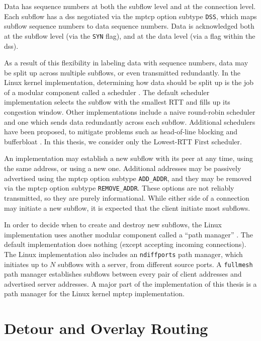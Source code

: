 \documentclass{cwru}
\begin{document}
Data has sequence numbers at both the subflow level and at the connection level.
Each subflow has a \ac{dss} negotiated via the \ac{mptcp} option subtype
\texttt{DSS}, which maps subflow sequence numbers to data sequence numbers. Data
is acknowledged both at the subflow level (via the \texttt{SYN} flag), and at
the data level (via a flag within the \ac{dss}).

As a result of this flexibility in labeling data with sequence numbers, data may
be split up across multiple subflows, or even transmitted redundantly. In the
Linux kernel implementation, determining how data should be split up is the job
of a modular component called a scheduler \cite{mptcp}. The default scheduler
implementation selects the subflow with the smallest RTT and fills up its
congestion window. Other implementations include a naive round-robin scheduler
and one which sends data redundantly across each subflow. Additional schedulers
have been proposed, to mitigate problems such as head-of-line blocking and
bufferbloat \cite{paasch2014experimental}. In this thesis, we consider only the
Lowest-RTT First scheduler.

An implementation may establish a new subflow with its peer at any time, using
the same address, or using a new one. Additional addresses may be passively
advertised using the \ac{mptcp} option subtype \texttt{ADD\_ADDR}, and they may
be removed via the \ac{mptcp} option subtype \texttt{REMOVE\_ADDR}. These
options are not reliably transmitted, so they are purely informational. While
either side of a connection may initiate a new subflow, it is expected that the
client initiate most subflows.

In order to decide when to create and destroy new subflows, the Linux
implementation uses another modular component called a ``path manager''
\cite{mptcp}. The default implementation does nothing (except accepting incoming
connections). The Linux implementation also includes an \texttt{ndiffports} path
manager, which initiates up to $N$ subflows with a server, from different source
ports. A \texttt{fullmesh} path manager establishes subflows between every pair
of client addresses and advertised server addresses. A major part of the
implementation of this thesis is a path manager for the Linux kernel \ac{mptcp}
implementation.

\section{Detour and Overlay Routing}
\end{document}
